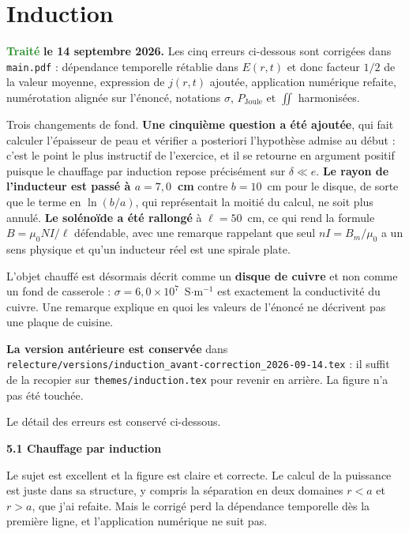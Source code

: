 \documentclass[a4paper,11pt]{article}
\newcommand{\exo}[1]{\vspace{0.7\baselineskip}\noindent\textbf{\large #1}\par\nopagebreak\vspace{0.2\baselineskip}}
\newcommand{\traite}{\textcolor{ForestGreen}{\textbf{Traité}}}
\begin{document}
\section{Induction}

\traite{} \textbf{le 14 septembre 2026.} Les cinq erreurs ci-dessous sont corrigées dans
\texttt{main.pdf} : dépendance temporelle rétablie dans $E(r,t)$ et donc facteur $1/2$ de la valeur
moyenne, expression de $j(r,t)$ ajoutée, application numérique refaite, numérotation alignée sur
l'énoncé, notations $\sigma$, $P_{\mathrm{Joule}}$ et $\iint$ harmonisées.

\medskip
Trois changements de fond. \textbf{Une cinquième question a été ajoutée}, qui fait calculer
l'épaisseur de peau et vérifier a posteriori l'hypothèse admise au début : c'est le point le plus
instructif de l'exercice, et il se retourne en argument positif puisque le chauffage par induction
repose précisément sur $\delta\ll e$. \textbf{Le rayon de l'inducteur est passé à $a=7{,}0$~cm}
contre $b=10$~cm pour le disque, de sorte que le terme en $\ln(b/a)$, qui représentait la moitié du
calcul, ne soit plus annulé. \textbf{Le solénoïde a été rallongé} à $\ell=50$~cm, ce qui rend la
formule $B=\mu_0NI/\ell$ défendable, avec une remarque rappelant que seul $nI=B_m/\mu_0$ a un sens
physique et qu'un inducteur réel est une spirale plate.

\medskip
L'objet chauffé est désormais décrit comme un \textbf{disque de cuivre} et non comme un fond de
casserole : $\sigma=6{,}0\times10^{7}$~S$\cdot$m$^{-1}$ est exactement la conductivité du cuivre. Une
remarque explique en quoi les valeurs de l'énoncé ne décrivent pas une plaque de cuisine.

\medskip
\textbf{La version antérieure est conservée} dans
\texttt{relecture/versions/induction\_avant-correction\_2026-09-14.tex} : il suffit de la recopier sur
\texttt{themes/induction.tex} pour revenir en arrière. La figure n'a pas été touchée.

\medskip
Le détail des erreurs est conservé ci-dessous.

\exo{5.1 Chauffage par induction}

Le sujet est excellent et la figure est claire et correcte. Le calcul de la puissance est juste dans
sa structure, y compris la séparation en deux domaines $r<a$ et $r>a$, que j'ai refaite. Mais le
corrigé perd la dépendance temporelle dès la première ligne, et l'application numérique ne suit pas.
\end{document}
